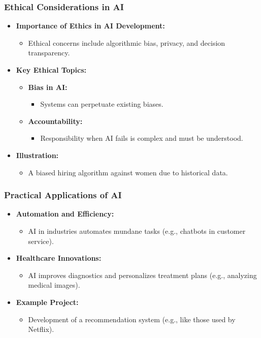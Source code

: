 \documentclass[aspectratio=169]{beamer}
\begin{document}
\begin{frame}[fragile]
    \frametitle{Ethical Considerations in AI}
    \begin{itemize}
        \item \textbf{Importance of Ethics in AI Development:}
            \begin{itemize}
                \item Ethical concerns include algorithmic bias, privacy, and decision transparency.
            \end{itemize}
        \item \textbf{Key Ethical Topics:}
            \begin{itemize}
                \item \textbf{Bias in AI:} 
                    \begin{itemize}
                        \item Systems can perpetuate existing biases.
                    \end{itemize}
                \item \textbf{Accountability:} 
                    \begin{itemize}
                        \item Responsibility when AI fails is complex and must be understood.
                    \end{itemize}
            \end{itemize}
        \item \textbf{Illustration:}
            \begin{itemize}
                \item A biased hiring algorithm against women due to historical data.
            \end{itemize}
    \end{itemize}
\end{frame}

\begin{frame}[fragile]
    \frametitle{Practical Applications of AI}
    \begin{itemize}
        \item \textbf{Automation and Efficiency:}
            \begin{itemize}
                \item AI in industries automates mundane tasks (e.g., chatbots in customer service).
            \end{itemize}
        \item \textbf{Healthcare Innovations:}
            \begin{itemize}
                \item AI improves diagnostics and personalizes treatment plans (e.g., analyzing medical images).
            \end{itemize}
        \item \textbf{Example Project:}
            \begin{itemize}
                \item Development of a recommendation system (e.g., like those used by Netflix).
            \end{itemize}
    \end{itemize}
\end{frame}
\end{document}
